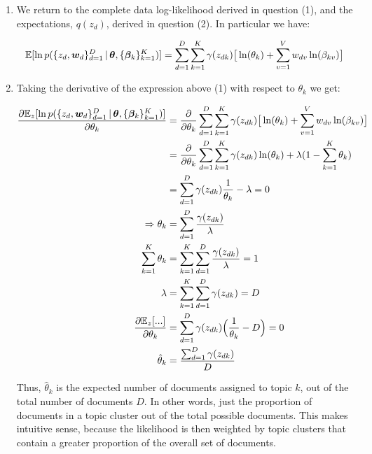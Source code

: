 \documentclass[submit]{harvardml}
\begin{document}
\begin{enumerate}[label=(\alph*)]
	\item We return to the complete data log-likelihood derived in question (1), and the expectations, $q(z_d)$, derived in question (2). In particular we have:
	
	\begin{equation}
	\mathbb{E}[\ln p(\{z_d,\boldsymbol{w}_d\}^D_{d=1}\,|\,\boldsymbol{\theta}, \{\boldsymbol{\beta}_k\}^K_{k=1})] = \sum_{d=1}^{D} \sum_{k=1}^{K}  \gamma(z_{dk}) \big[\ln (\theta_k) + \sum_{v=1}^{V} w_{dv} \ln (\beta_{kv}) \big]
	\end{equation}
	
	\item Taking the derivative of the expression above (1) with respect to $\theta_k$ we get:
	
	\begin{align*}
	\frac{\partial \mathbb{E}_z [\ln p(\{z_d,\boldsymbol{w}_d\}^D_{d=1}\,|\,\boldsymbol{\theta}, \{\boldsymbol{\beta}_k\}^K_{k=1})]}{\partial \theta_k} 
	& = \frac{\partial}{\partial \theta_k} \sum_{d=1}^{D} \sum_{k=1}^{K}  \gamma(z_{dk}) \big[\ln (\theta_k) + \sum_{v=1}^{V} w_{dv} \ln (\beta_{kv}) \big] \\
	& = \frac{\partial}{\partial \theta_k} \sum_{d=1}^{D} \sum_{k=1}^{K}  \gamma(z_{dk}) \ln (\theta_k) + \lambda(1-\sum_{k=1}^{K}\theta_k)  \\
	& = \sum_{d=1}^{D} \gamma(z_{dk}) \frac{1}{\theta_k} - \lambda = 0 \\
	\Rightarrow \theta_k & = \sum_{d=1}^{D} \frac{\gamma(z_{dk})}{\lambda} \\
	\sum_{k=1}^{K} \theta_k & = \sum_{k=1}^{K} \sum_{d=1}^{D} \frac{\gamma(z_{dk})}{\lambda} = 1 \\
	\lambda & =  \sum_{k=1}^{K} \sum_{d=1}^{D} \gamma(z_{dk}) =  D \\
	\frac{\partial \mathbb{E}_z [...]}{\partial \theta_k}
	& = \sum_{d=1}^{D} \gamma(z_{dk}) \Big(\frac{1}{\theta_k} - D \Big) = 0 \\
	\hat{\theta}_k & = \frac{\sum_{d=1}^{D}\gamma(z_{dk})}{D}
	\end{align*}
	
	Thus, $\hat{\theta}_k$ is the expected number of documents assigned to topic $k$, out of the total number of documents $D$. In other words, just the proportion of documents in a topic cluster out of the total possible documents. This makes intuitive sense, because the likelihood is then weighted by topic clusters that contain a greater proportion of the overall set of documents. 
	

\end{enumerate}
\end{document}
